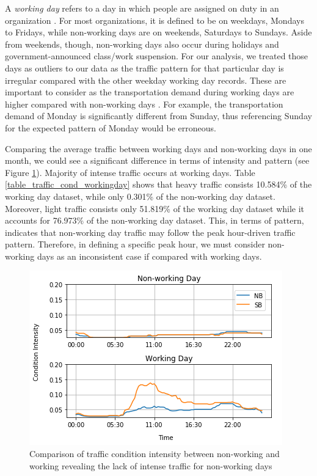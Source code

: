 	A \textit{working day} refers to a day in which people are assigned on duty in an organization  \cite{liu2008wdcm}. For most organizations, it is defined to be on weekdays, Mondays to Fridays, while non-working days are on weekends, Saturdays to Sundays. Aside from weekends, though, non-working days also occur during holidays and government-announced class/work suspension. For our analysis, we treated those days as outliers to our data as the traffic pattern for that particular day is irregular compared with the other weekday working day records. These are important to consider as the transportation demand during working days are higher compared with non-working days \cite{traffic_trend}. For example, the transportation demand of Monday is significantly different from Sunday, thus referencing Sunday for the expected pattern of Monday would be erroneous.

	Comparing the average traffic between working days and non-working days in one month, we could see a significant difference in terms of intensity and pattern (see Figure \ref{figure_workingday_comparison}). Majority of intense traffic occurs at working days. Table \ref{table_traffic_cond_workingday} shows that heavy traffic consists 10.584\% of the working day dataset, while only 0.301\% of the non-working day dataset. Moreover, light traffic consists only 51.819\% of the working day dataset while it accounts for 76.973\% of the non-working day dataset. This, in terms of pattern, indicates that non-working day traffic may follow the peak hour-driven traffic pattern. Therefore, in defining a specific peak hour, we must consider non-working days as an inconsistent case if compared with working days.
    

\begin{figure}
  \includegraphics[width=\linewidth]{figures/figure_workingday_comparison.png}
  \caption{Comparison of traffic condition intensity between non-working and working revealing the lack of intense traffic for non-working days}
  \label{figure_workingday_comparison}
\end{figure}

